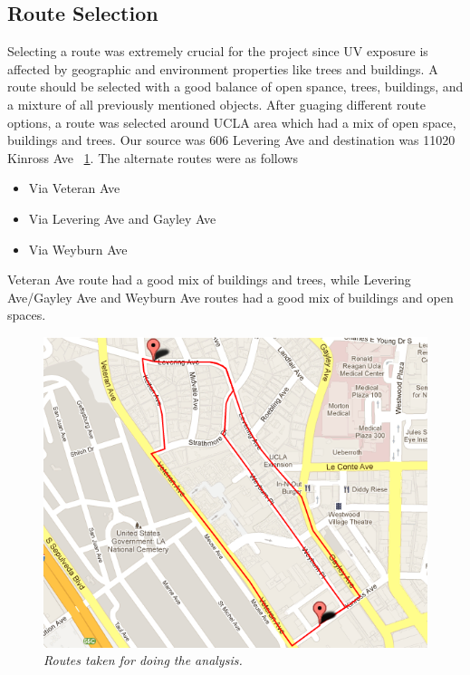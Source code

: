 \documentclass[12pt,fullpage,doublespace]{article}
\begin{document}
\subsection{Route Selection}
Selecting a route was extremely crucial for the project since UV exposure is affected by geographic and environment properties like trees and buildings. A route should be selected with a good balance of open spance, trees, buildings, and a mixture of all previously mentioned objects. After guaging different route options, a route was selected around UCLA area which had a mix of open space, buildings and trees.  Our source was 606 Levering Ave and destination was 11020 Kinross Ave ~\ref{fig:Route}.  The alternate routes were as follows
 \begin{itemize}
\item  Via Veteran Ave 
\item Via Levering Ave and Gayley Ave
\item Via Weyburn Ave
 \end{itemize}
Veteran Ave route had a good mix of buildings and trees, while Levering Ave/Gayley Ave and Weyburn Ave routes had a good mix of buildings and open spaces. 
\begin{figure} [hb] 
\begin{center}  
\includegraphics[scale=0.4]{allRoutes.png}
\caption{\small \sl Routes taken for doing the analysis.\label{fig:Route}}  
\end{center}  
\end{figure} 
\end{document}
